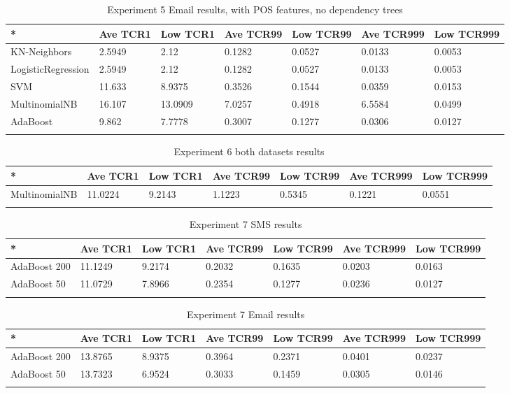 \documentclass[11pt,a4paper]{article}
\begin{document}
\begin{table}[t!]
\centering
\begin{tabular}{lllllll}
 *& Ave TCR1 &Low TCR1&Ave TCR99&Low TCR99&Ave TCR999&Low TCR999\\
  \hline
  KN-Neighbors& 2.5949	&2.12&	0.1282&	0.0527&	0.0133	&0.0053	\\
LogisticRegression&2.5949&	2.12&	0.1282&	0.0527&	0.0133&	0.0053	\\
SVM& 11.633	&8.9375	&0.3526&	0.1544&	0.0359&	0.0153	\\
MultinomialNB &16.107&	13.0909	&7.0257&	0.4918&	6.5584&	0.0499	\\
AdaBoost& 9.862&	7.7778&	0.3007&	0.1277&	0.0306&	0.0127	\\

 \\
\end{tabular}
\caption{Experiment 5 Email results, with POS features, no dependency trees}
\end{table}

\begin{table}[t!]
\centering
\begin{tabular}{lllllll}
 *& Ave TCR1 &Low TCR1&Ave TCR99&Low TCR99&Ave TCR999&Low TCR999\\
  \hline
MultinomialNB &11.0224&	9.2143&	1.1223	&0.5345&	0.1221&	0.0551	\\

 \\
\end{tabular}
\caption{Experiment 6 both datasets results}
\end{table}

\begin{table}[t!]
\centering
\begin{tabular}{lllllll}
 *& Ave TCR1 &Low TCR1&Ave TCR99&Low TCR99&Ave TCR999&Low TCR999\\
  \hline
AdaBoost 200 &11.1249&	9.2174&	0.2032&	0.1635&	0.0203&	0.0163	\\
AdaBoost 50 &11.0729&	7.8966	&0.2354	&0.1277&	0.0236&	0.0127	\\

 \\
\end{tabular}
\caption{Experiment 7 SMS results}
\end{table}

\begin{table}[t!]
\centering
\begin{tabular}{lllllll}
 *& Ave TCR1 &Low TCR1&Ave TCR99&Low TCR99&Ave TCR999&Low TCR999\\
  \hline
AdaBoost 200 &13.8765&	8.9375&	0.3964&	0.2371&	0.0401&	0.0237	\\
AdaBoost 50 &13.7323&	6.9524	&0.3033&	0.1459&	0.0305&	0.0146	\\

 \\
\end{tabular}
\caption{Experiment 7 Email results}
\end{table}
\end{document}
